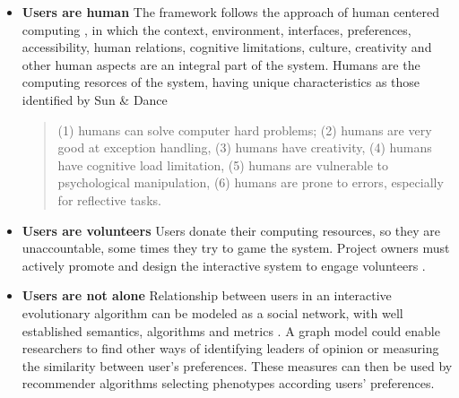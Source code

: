 \begin{itemize}
\item {\bf Users are human} 
  The framework follows the approach of human centered computing \cite{sebe2010human},
  in which the context, environment, interfaces, preferences, accessibility, human relations, cognitive
  limitations, culture, creativity and other human aspects are an integral part of the system.
  Humans are the computing resorces of the system, having unique characteristics as those identified by 
  Sun \& Dance \cite{Sun2013}
\begin{quote}
  (1) humans can solve computer hard problems; (2) humans are very good at exception handling, (3) humans have creativity, (4) humans have cognitive load limitation, (5) humans are vulnerable to 
  psychological manipulation, (6) humans are prone to errors,
  especially for reflective tasks.
\end{quote}  


\item {\bf Users are volunteers} Users donate their computing resources, so they are unaccountable, 
  some times they try to game the system. Project owners must actively promote and design the interactive
  system to engage volunteers \cite{oh2015clicking}. %

\item {\bf Users are not alone}
  Relationship between users in an interactive evolutionary algorithm can be modeled
  as a social network, with well established semantics, algorithms and metrics \cite{ahuja1993network}.
  A graph model could enable researchers to find other ways of identifying leaders of 
  opinion or measuring the similarity between user's preferences. 
  These measures can then be used by recommender algorithms selecting 
  phenotypes according users' preferences. 


\end{itemize}
